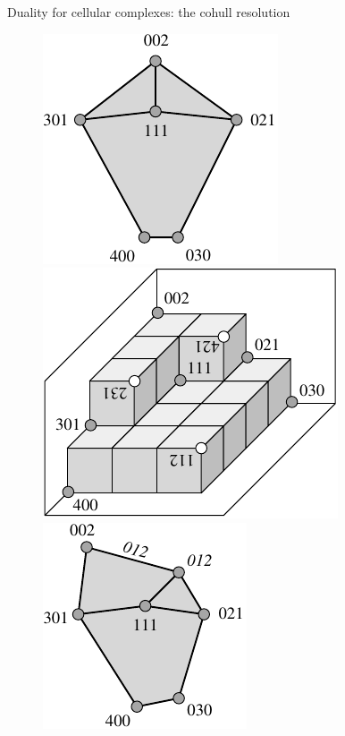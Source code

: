 \documentclass[12pt,leqno]{article}
\begin{document}
\begin{section}{Duality for cellular complexes: the cohull resolution}
\begin{figure}[!hbp]
{\vskip 1mm
\noindent
\mbox{}
\hfill \includegraphics{small24d}
\hfill \includegraphics{small24e}
\hfill \includegraphics{small24f}
\hfill \mbox{}

}
\end{figure}
\end{section}
\end{document}
